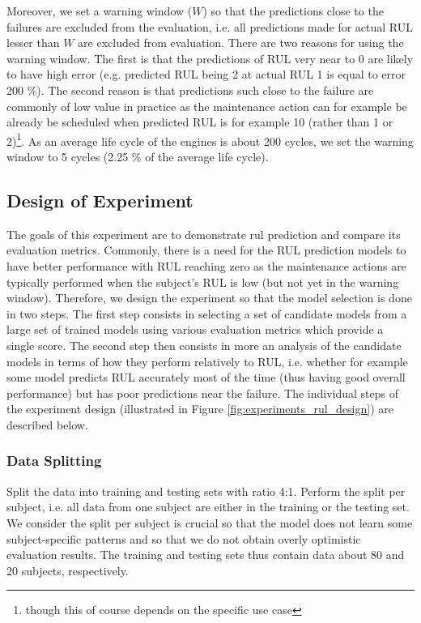 Moreover, we set a warning window ($W$) so that the predictions close to the failures are excluded from the evaluation, i.e. all predictions made for actual RUL lesser than $W$ are excluded from evaluation.
There are two reasons for using the warning window.
The first is that the predictions of RUL very near to 0 are likely to have high error (e.g. predicted RUL being 2 at actual RUL 1 is equal to error 200 \%).
The second reason is that predictions such close to the failure are commonly of low value in practice as the maintenance action can for example be already be scheduled when predicted RUL is for example 10 (rather than 1 or 2)\footnote{though this of course depends on the specific use case}.
As an average life cycle of the engines is about 200 cycles, we set the warning window to 5 cycles (2.25 \% of the average life cycle).

\subsection{Design of Experiment}
\label{sec:experiment_rul_doe}

The goals of this experiment are to demonstrate \gls{rul} prediction and compare its evaluation metrics.
Commonly, there is a need for the RUL prediction models to have better performance with RUL reaching zero as the maintenance actions are typically performed when the subject's RUL is low (but not yet in the warning window).
Therefore, we design the experiment so that the model selection is done in two steps.
The first step consists in selecting a set of candidate models from a large set of trained models using various evaluation metrics which provide a single score.
The second step then consists in more an analysis of the candidate models in terms of how they perform relatively to RUL, i.e. whether for example some model predicts RUL accurately most of the time (thus having good overall performance) but has poor predictions near the failure.
The individual steps of the experiment design (illustrated in Figure \ref{fig:experiments_rul_design}) are described below.

\subsubsection{Data Splitting}

Split the data into training and testing sets with ratio 4:1.
Perform the split per subject, i.e. all data from one subject are either in the training or the testing set.
We consider the split per subject is crucial so that the model does not learn some subject-specific patterns and so that we do not obtain overly optimistic evaluation results.
The training and testing sets thus contain data about 80 and 20 subjects, respectively.

